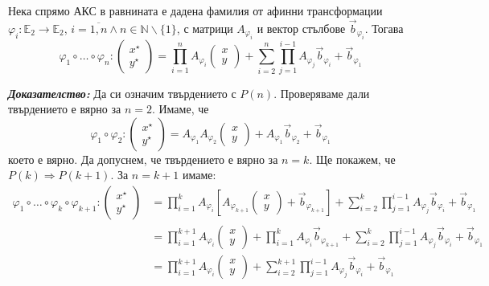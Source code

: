 \documentclass[12pt]{article}
\begin{document}
\begin{tcolorbox}[
    colback=blue!5,    %
    colframe=blue!75!black, %
    title={\textbf{Твърдение 14 (За любознателните):}}, %
    fonttitle=\bfseries,
    boxrule=0.8pt,
    arc=1mm,           %
    top=2mm, bottom=2mm, left=3mm, right=3mm
] Нека спрямо АКС в равнината е дадена фамилия от афинни трансформации $\varphi_i:\mathbb{E}_2\to\mathbb{E}_2$, $i=\overline{1,n}\wedge n\in\mathbb{N}\backslash\{1\}$, с матрици $A_{\varphi_i}$ и вектор стълбове $\vec{b}_{\varphi_i}$. Тогава $$\varphi_1\circ\dots\circ \varphi_n:\begin{pmatrix}x^\star \\ y^\star\end{pmatrix}=\prod_{i=1}^n A_{\varphi_i}\begin{pmatrix} x\\ y\end{pmatrix}+\sum_{i=2}^{n}\prod_{j=1}^{i-1} A_{\varphi_j}\vec{b}_{\varphi_i}+\vec{b}_{\varphi_1}
$$
\end{tcolorbox}
\textbf{\textit{Доказателство:}} Да си означим твърдението с $P(n)$. Проверяваме дали твърдението е вярно за $n = 2$. Имаме, че $$\varphi_1\circ\varphi_2:\begin{pmatrix}x^\star \\ y^\star\end{pmatrix}=A_{\varphi_1}A_{\varphi_2}\begin{pmatrix}x \\ y\end{pmatrix}+A_{\varphi_1}\vec{b}_{\varphi_2}+\vec{b}_{\varphi_1}
$$ което е вярно. Да допуснем, че твърдението е вярно за $n=k$. Ще покажем, че $P(k)\Rightarrow P(k+1)$. За $n=k+1$ имаме: \begin{align*}\varphi_1\circ\dots\circ \varphi_k\circ\varphi_{k+1}:\begin{pmatrix} x^\star \\ y^{\star}\end{pmatrix} &=\prod_{i=1}^{k} A_{\varphi_i}\left[A_{\varphi_{k+1}}\begin{pmatrix} x \\ y\end{pmatrix}+\vec{b}_{\varphi_{k+1}}\right]+\sum_{i=2}^{k}\prod_{j=1}^{i-1}A_{\varphi_j}\vec{b}_{\varphi_i}+\vec{b}_{\varphi_1}\\ &= \prod_{i=1}^{k+1} A_{\varphi_i}\begin{pmatrix} x \\ y\end{pmatrix}+\prod_{i=1}^{k} A_{\varphi_i}\vec{b}_{\varphi_{k+1}}+\sum_{i=2}^{k}\prod_{j=1}^{i-1}A_{\varphi_j}\vec{b}_{\varphi_i}+\vec{b}_{\varphi_1} \\ &=\prod_{i=1}^{k+1}A_{\varphi_i}\begin{pmatrix} x\\ y\end{pmatrix}+\sum_{i=2}^{k+1}\prod_{j=1}^{i-1} A_{\varphi_j}\vec{b}_{\varphi_i}+\vec{b}_{\varphi_1}
\end{align*}
\end{document}
